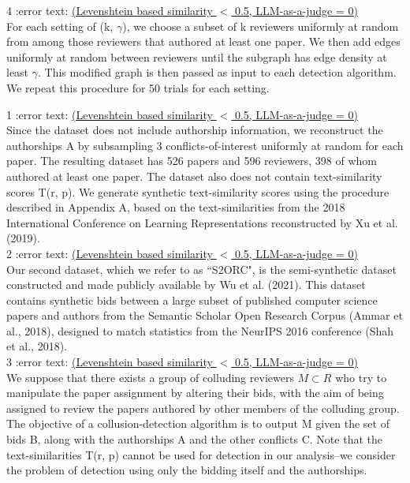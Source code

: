 \documentclass{article}
\newcommand{\gemini}{\texttt{Gemini 2.5 Pro}}
\newcommand{\grok}{\texttt{Grok 4}}
\begin{document}
\begin{appendix}
\begin{tcolorbox} [breakable,colback=black!5!white,colframe=black!20!white,title=\textbf{\textcolor{black}{Failed Identification using \gemini}}]
4 :error text: \underline{(Levenshtein based similarity $<$ 0.5, LLM-as-a-judge = 0)}\\
For each setting of (k, $\gamma$), we choose a subset of k reviewers uniformly at random from among those reviewers that authored at least one paper. We then add edges uniformly at random between reviewers until the subgraph has edge density at least $\gamma$. This modified graph is then passed as input to each detection algorithm. We repeat this procedure for 50 trials for each setting.\\
\end{tcolorbox}
\begin{tcolorbox}[breakable,colback=black!5!white,colframe=black!20!white,title=\textbf{\textcolor{black}{Succeeded Identification using \grok}}]
1 :error text: \underline{(Levenshtein based similarity $<$ 0.5, LLM-as-a-judge = 0)}\\
Since the dataset does not include authorship information, we reconstruct the authorships A by subsampling 3 conflicts-of-interest uniformly at random for each paper. The resulting dataset has 526 papers and 596 reviewers, 398 of whom authored at least one paper. The dataset also does not contain text-similarity scores T(r, p). We generate synthetic text-similarity scores using the procedure described in Appendix A, based on the text-similarities from the 2018 International Conference on Learning Representations reconstructed by Xu et al. (2019).\\

2 :error text: \underline{(Levenshtein based similarity $<$ 0.5, LLM-as-a-judge = 0)}\\
Our second dataset, which we refer to as ``S2ORC", is the semi-synthetic dataset constructed and made publicly available by Wu et al. (2021). This dataset contains synthetic bids between a large subset of published computer science papers and authors from the Semantic Scholar Open Research Corpus (Ammar
et al., 2018), designed to match statistics from the NeurIPS 2016 conference (Shah et al., 2018).\\

3 :error text: \underline{(Levenshtein based similarity $<$ 0.5, LLM-as-a-judge = 0)}\\
We suppose that there exists a group of colluding reviewers $M \subset R$ who try to manipulate the paper assignment by altering their bids, with the aim of being assigned to review the papers authored by other members of the colluding group. The objective of a collusion-detection algorithm is to output M given the set of bids B, along with the authorships A and the other conflicts C. Note that the text-similarities T(r, p) cannot be used for detection in our analysis–we consider the problem of detection using only the bidding itself and the authorships.\\


\end{tcolorbox}
\end{appendix}
\end{document}
